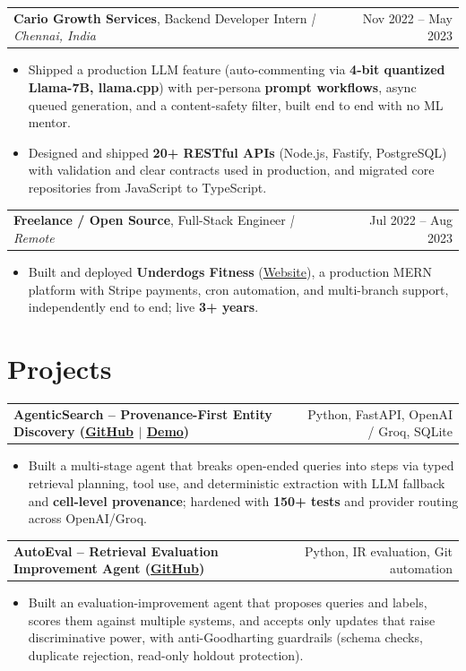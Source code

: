 \documentclass[letterpaper,11pt]{article}
\makeatletter
\newcommand{\expItem}[4]{%
  \vspace{3pt}
  \begin{tabular*}{\textwidth}{@{}l@{\extracolsep{\fill}}r@{}}
    \textbf{#1}, #2 \textit{| #3} & #4 \\
  \end{tabular*}\par\vspace{-2pt}
}
\newcommand{\projItem}[2]{%
  \vspace{6pt}
  \begin{tabular*}{\textwidth}{@{}l@{\extracolsep{\fill}}r@{}}
    \textbf{#1} & #2 \\
  \end{tabular*}\par\vspace{-2pt}
}
\makeatother
\begin{document}
\expItem{Cario Growth Services}{Backend Developer Intern}{Chennai, India}{Nov 2022 -- May 2023}
\begin{itemize}
  \item Shipped a production LLM feature (auto-commenting via \textbf{4-bit quantized Llama-7B, llama.cpp}) with per-persona \textbf{prompt workflows}, async queued generation, and a content-safety filter, built end to end with no ML mentor.
  \item Designed and shipped \textbf{20+ RESTful APIs} (Node.js, Fastify, PostgreSQL) with validation and clear contracts used in production, and migrated core repositories from JavaScript to TypeScript.
\end{itemize}

\expItem{Freelance / Open Source}{Full-Stack Engineer}{Remote}{Jul 2022 -- Aug 2023}
\begin{itemize}
  \item Built and deployed \textbf{Underdogs Fitness} (\href{https://www.underdogsfitness.in/}{Website}), a production MERN platform with Stripe payments, cron automation, and multi-branch support, independently end to end; live \textbf{3+ years}.
\end{itemize}

\section{Projects}

\projItem{AgenticSearch -- Provenance-First Entity Discovery {\normalfont\small(\href{https://github.com/Deva-1903/ciir_agentic_search}{GitHub} $\vert$ \href{https://agentic-search-negglszkwa-uc.a.run.app}{Demo})}}{Python, FastAPI, OpenAI / Groq, SQLite}
\begin{itemize}
  \item Built a multi-stage agent that breaks open-ended queries into steps via typed retrieval planning, tool use, and deterministic extraction with LLM fallback and \textbf{cell-level provenance}; hardened with \textbf{150+ tests} and provider routing across OpenAI/Groq.
\end{itemize}

\projItem{AutoEval -- Retrieval Evaluation Improvement Agent {\normalfont\small(\href{https://github.com/Deva-1903/AutoEval}{GitHub})}}{Python, IR evaluation, Git automation}
\begin{itemize}
  \item Built an evaluation-improvement agent that proposes queries and labels, scores them against multiple systems, and accepts only updates that raise discriminative power, with anti-Goodharting guardrails (schema checks, duplicate rejection, read-only holdout protection).
\end{itemize}
\end{document}

